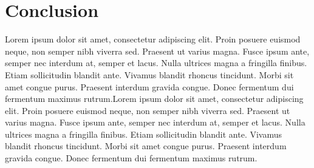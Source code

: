 \section{Conclusion}
Lorem ipsum dolor sit amet, consectetur adipiscing elit. Proin posuere euismod neque, non semper nibh viverra sed. Praesent ut varius magna. Fusce ipsum ante, semper nec interdum at, semper et lacus. Nulla ultrices magna a fringilla finibus. Etiam sollicitudin blandit ante. Vivamus blandit rhoncus tincidunt. Morbi sit amet congue purus. Praesent interdum gravida congue. Donec fermentum dui fermentum maximus rutrum.Lorem ipsum dolor sit amet, consectetur adipiscing elit. Proin posuere euismod neque, non semper nibh viverra sed. Praesent ut varius magna. Fusce ipsum ante, semper nec interdum at, semper et lacus. Nulla ultrices magna a fringilla finibus. Etiam sollicitudin blandit ante. Vivamus blandit rhoncus tincidunt. Morbi sit amet congue purus. Praesent interdum gravida congue. Donec fermentum dui fermentum maximus rutrum.

